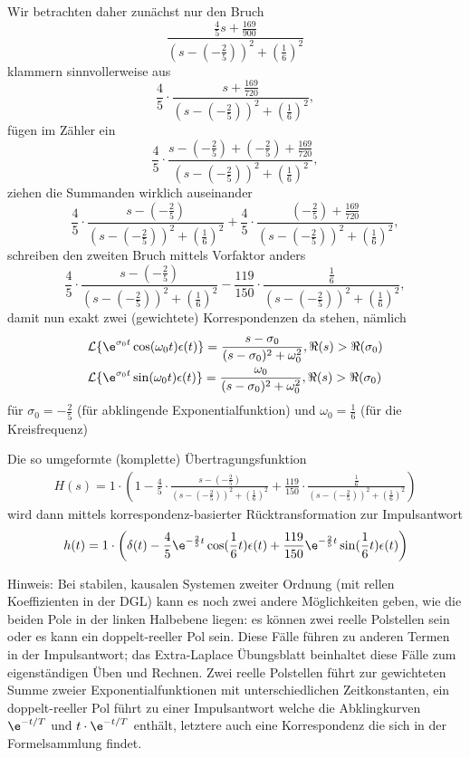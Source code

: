 \begin{ExCalc}
Wir betrachten daher zunächst nur den Bruch
$$\frac{\frac{4}{5}s + \frac{169}{900}}{(s-(-\frac{2}{5}))^2+(\frac{1}{6})^2}$$
klammern sinnvollerweise aus
$$\frac{4}{5} \cdot \frac{s + \frac{169}{720}}{(s-(-\frac{2}{5}))^2+(\frac{1}{6})^2},$$
fügen im Zähler ein
$$\frac{4}{5} \cdot \frac{s -(-\frac{2}{5})+(-\frac{2}{5}) + \frac{169}{720}}{(s-(-\frac{2}{5}))^2+(\frac{1}{6})^2},$$
ziehen die Summanden wirklich auseinander
$$\frac{4}{5} \cdot \frac{s -(-\frac{2}{5})}{(s-(-\frac{2}{5}))^2+(\frac{1}{6})^2}+
\frac{4}{5} \cdot \frac{(-\frac{2}{5}) + \frac{169}{720}}{(s-(-\frac{2}{5}))^2+(\frac{1}{6})^2},$$
schreiben den zweiten Bruch mittels Vorfaktor anders
$$\frac{4}{5} \cdot \frac{s -(-\frac{2}{5})}{(s-(-\frac{2}{5}))^2+(\frac{1}{6})^2}-
\frac{119}{150}\cdot \frac{\frac{1}{6}}{(s-(-\frac{2}{5}))^2+(\frac{1}{6})^2},$$
damit nun exakt zwei (gewichtete) Korrespondenzen da stehen, nämlich
\begin{align}
&\mathcal{L}\{\e^{\sigma_0 t} \cos(\omega_0 t)\epsilon(t)\} = \frac{s-\sigma_0}{(s-\sigma_0)^2+\omega_0^2}, \Re(s)>\Re(\sigma_0)\\
&\mathcal{L}\{\e^{\sigma_0 t} \sin(\omega_0 t)\epsilon(t)\} = \frac{\omega_0}{(s-\sigma_0)^2+\omega_0^2}, \Re(s)>\Re(\sigma_0)
\end{align}
für $\sigma_0 = -\frac{2}{5}$ (für abklingende Exponentialfunktion) und $\omega_0 = \frac{1}{6}$ (für die Kreisfrequenz)

Die so umgeformte (komplette) Übertragungsfunktion
\begin{align}
H(s) = 1 \cdot \left(1 - \frac{4}{5} \cdot \frac{s -(-\frac{2}{5})}{(s-(-\frac{2}{5}))^2+(\frac{1}{6})^2}+
\frac{119}{150}\cdot \frac{\frac{1}{6}}{(s-(-\frac{2}{5}))^2+(\frac{1}{6})^2}\right)
\end{align}
wird dann mittels korrespondenz-basierter Rücktransformation zur Impulsantwort
\begin{align}
h(t) = 1 \cdot \left(
\delta(t)
- \frac{4}{5} \e^{-\frac{2}{5}t} \cos(\frac{1}{6}t)\epsilon(t) +
\frac{119}{150} \e^{-\frac{2}{5}t} \sin(\frac{1}{6}t)\epsilon(t)\right)
\end{align}

Hinweis: Bei stabilen, kausalen Systemen zweiter Ordnung (mit rellen Koeffizienten in der DGL) kann es noch zwei andere Möglichkeiten geben, wie die beiden Pole in der linken Halbebene liegen: es können zwei reelle Polstellen sein oder es kann ein doppelt-reeller Pol sein. Diese Fälle führen zu anderen Termen in der Impulsantwort; das Extra-Laplace Übungsblatt beinhaltet diese Fälle zum eigenständigen Üben und Rechnen. Zwei reelle Polstellen führt zur gewichteten Summe zweier Exponentialfunktionen mit unterschiedlichen Zeitkonstanten, ein doppelt-reeller Pol führt zu einer Impulsantwort welche die Abklingkurven $\e^{-t/T}$ und $t \cdot \e^{-t/T}$ enthält, letztere auch eine Korrespondenz die sich in der Formelsammlung findet.


\end{ExCalc}
